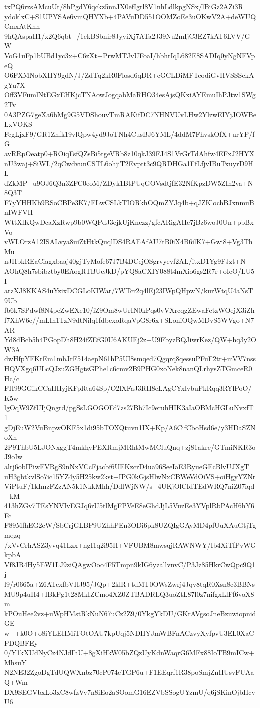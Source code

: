 txPQ6rzsAMcuUt/8hPgdY6qckz5nnJX0efIgrl8V1nhLdlkpgNSx/lBiGz2AZi3R
ydoklxC+S1UPYSAe6vmQHYXb+4PAVuDD551OOMZoEe3uOKwV2A+deWUQCmxAtKnn
9hQAspaH1/x2Q6qbt+/1ekBSbnir8JyyiXj7ATa2J39Nu2mIjC3EZ7kAT6LVV/GW
VoG1uFp1bUBd1yc3x+C6zXt+PrwMTJvUFoaI/hbhrIqL682E8SADIq0yNgNFVpeQ
O6FXMNobXHY9gdN/J/ZdTq2kR0Flosd6qDR+cGCLDiMFTcodiGvHVSSSekAgYu7X
Off3VFumlNtEGxEHKjcTNAowJogqabMaRHO34esAjsQKxiAYEmuIhPJtw1SWg2Tv
0A3PZG7geXa6bMg9G5VDShouvTmRAKifDC7NHNVUvLHw2YlzwEIYjJOWBeLxVOKS
FcgLjxF9/GR1Zhfk19vlQpw4yd9JoTNh4CusBJ6YML/4ddM7FhvskOfX+urYP/fG
avRRpOeatp0+ROiqFsfQZsBi5tgeVRb8z10qkJ39FJ4S1VrGrTdAhfw4EFxJ2HYX
nU3waj+SiWL/2qCwdvunCSTL6ohjiT2Evptt3c9QRDHGa1FfLfjvIBuTxuyrD9HL
dZkMP+u9OJ6Q3n3ZFC0eoM/ZDyk1BtPUqGOVsdtjfE32NfKpzDW5ZIn2va+N8Q3T
F7yYHHKb9RSoCBPe3K7/FLwCSLkTIORkhOQmZYJq4b+qJZKlochBJxnmuBnIWFVH
WttXlKQwDcaXzRwp9b0WQPdJ3ejkUjKnezz/gfcARigAHe7jBz6woJ0Un+pbBxVo
vWLOrzA12ISALvya8uiZtHtkQuqlDS4RAEAfAU7tB0iX4B6ilK7+Gwi8+Vg3ThMu
nJHbkREaCiagxbaaj40gjTyMofe67J7B4DCejOSgrvyevf2AL/itxD1Yg9FJzt+N
AOhQ8h7sbibztby0EAogRTBUeJkD/pYQ8aCXIY088t4mXio6gs2R7r+oIeO/LU5I
arzXJ8KKAS4uYzixDCGLoKIWar/7WTcr2q4lEj23IWpQHpwN/kurWtqU4aNsT9Ub
fb6k7SPdwf8N4peZwEXe10/iZ9Om8wUrIN0kPqs0vVXrcqgZEwaFetzWOejX3iZh
f7XhW6e//mLIh1TzN9dtNilq1fdbcxoRqaVpG8r6x+SLoniOQwMDvS5WVgo+N7AR
Yd8dBcb5h4PGopDh8H24fZEfG0U6AKUEj2z+U9FbyzBQJiwrKez/QW+hq3y2OW3A
dwHfpYFKrEm1mhJrF514aepN61hP5UI8smqed7Qgqrq8qessuPFuF2tr+mVV7nss
HQVXgq6ULcQJzuZGHgtsGPhe1c6cmv2B9PHG0xoNek8nanQLrhysZTGmceR0Hc/c
FH99GGikCCaHHyjKFpRta64Sp/O2lXFaJ3RH8eLAgCYxlvbuPkRqq3RYlPoO/K5w
lgOqW9ZfUIjQngrd/pgSsLGOGOFd7zs27Bb7Ic9eruhHIK3aIaOBMcHGLuNvxfT1
gDjEuW2VuBnpwOKF5x1di95bTOXQtuvn1IX+Kp/A6CifCboHsd6e/y3HDaSZNoXh
2P9ThbU5LJONxggT4mkhyPEXRmjMRhtMwMCluQnq+zj81akre/GTmiNKR3oJ9oIw
alrj6obIPiwFVRgS9nNxVCcFjacbf6UEKzcrD4ua96SeeIaE3RyueGEcBlvUJXgT
uH3gbtkvlSo7ic15YZ4y5H25kw2kst+IPG0kGjsHlwNxCBWeVdOiVS+oiHgyYZNr
ViPtuF/1kImzFZzAN5k1NkkMhh/DdlWjNW/s+4UKjOlCIdTEdWRQ7niZ07iqd+kM
413hZGv7TEsYNVIvEGJq6rU5tlMgFPVeE8eGhdJjL5VuzEe3YVplRbPAcH6hY6Fc
F89MfhEG2eW/SbCrjGLBP9UZhhPEn3ODi6pk8UZQIgGAyMD4pfUuXAuGtjTgmqzq
/xVvCrhASZ3yvq41Lzx+ngI1q2i95H+VFUBM8mwsqjRAWNWY/Ib4XiTfPvWGkpbA
Vf8JR4Hy5EW1LJ9ziQAgwOoo4F5Tmpn9kIG6yzallvnvC/P3Jz85HkrCwQpc9Q1j
l9/r0665a+Z6ATcxfbVHJ95/JQp+2klR+tdMT0OWsZwrj4Jqv8tqR0Xsn8c3BBNs
MU9p4uH4+IBkPg1t28MkIZCmo4XZ0ZTBADRLQ3uoZtL87l0z7nifgxLlFf6voX8m
kPOuHee2vz+uWpHMstRkNuN67uCz2Z9/0YkgYkDU/GKrAVgsoJneBzuwiopnidGE
w++k0O+o8iYLEHMiTOtOAU7kpUqj5NDHYJmWBFnACzvyXyfpvU3EL0XaCPDQBFEy
0/Y1kXUdNyCz4NJdIhU+8gXiHkW05bZQzUyKdnWaqrG6MFx88IoTB9mICw+MhsuY
N2NE32ZgoDgTdUQWXnbz70cP074eTGP6u+F1EEqrf1R38poSmjZnHUsvFUAaQ+Wm
DX9SEGVbxLo3xC8wfzVv7n8iEo2aSOomG16EZVbSSogUYzmU/q6jSKinOjbHcvU6
